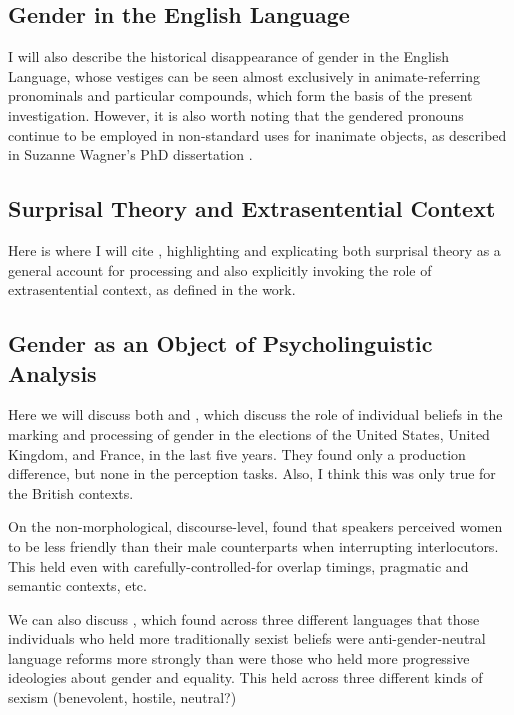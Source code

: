 \documentclass{article}
\begin{document}
	\subsection{Gender in the English Language}
	
	I will also describe the historical disappearance of gender in the English Language, whose vestiges can be seen almost exclusively in animate-referring pronominals and particular compounds, which form the basis of the present investigation. However, it is also worth noting that the gendered pronouns continue to be employed in non-standard uses for inanimate objects, as described in Suzanne Wagner's PhD dissertation \parencite{wagner2003gender}.
	
	\subsection{Surprisal Theory and Extrasentential Context}
	
	Here is where I will cite \parencite{levy2008expectation}, highlighting and explicating both surprisal theory as a general account for processing and also explicitly invoking the role of extrasentential context, as defined in the work.
	
	\subsection{Gender as an Object of Psycholinguistic Analysis}
	
	Here we will discuss both \textcite{pozniak2021failures} and \textcite{von2020implicit}, which discuss the role of individual beliefs in the marking and processing of gender in the elections of the United States, United Kingdom, and France, in the last five years. They found only a production difference, but none in the perception tasks. Also, I think this was only true for the British contexts.
	
	On the non-morphological, discourse-level, \textcite{hilton2022} found that speakers perceived women to be less friendly than their male counterparts when interrupting interlocutors. This held even with carefully-controlled-for overlap timings, pragmatic and semantic contexts, etc.
	
	We can also discuss \textcite{sarrasin2012sexism}, which found across three different languages that those individuals who held more traditionally sexist beliefs were anti-gender-neutral language reforms more strongly than were those who held more progressive ideologies about gender and equality. This held across three different kinds of sexism (benevolent, hostile, neutral?)
	
\end{document}
